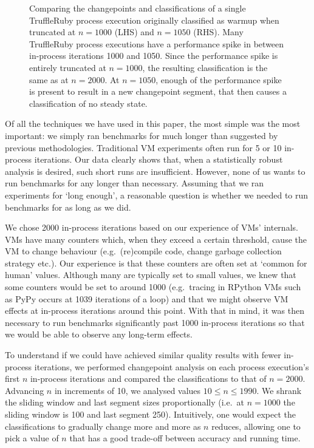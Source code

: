 \documentclass[acmsmall]{acmart}\settopmatter{printfolios=true}
\begin{document}
\begin{figure}[!tbp]
\begin{minipage}[t]{0.485\textwidth}
\end{minipage}
\caption{Comparing the changepoints and classifications of a
single TruffleRuby process execution originally classified as warmup when
truncated at $n = 1000$ (LHS) and $n = 1050$ (RHS). Many TruffleRuby process
executions have a performance spike in between in-process iterations 1000 and
1050. Since the performance spike is entirely truncated at $n=1000$,
the resulting classification is the same as at $n=2000$. At $n=1050$,
enough of the performance spike is present to result in a new changepoint segment,
that then causes a classification of no steady state.}
\label{fig:truncated}
\end{figure}

Of all the techniques we have used in this paper, the most simple was the most
important: we simply ran benchmarks for much longer than suggested by previous methodologies.
Traditional VM experiments often run for 5 or 10 in-process iterations. Our data
clearly shows that, when a statistically robust analysis is desired, such short
runs are insufficient. However, none of us wants to run benchmarks for any longer
than necessary. Assuming that we ran
experiments for `long enough', a reasonable question is whether we needed to run
benchmarks for as long as we did.

We chose 2000 in-process iterations based on our experience of VMs' internals.
VMs have many counters which, when they exceed a certain threshold, cause the VM
to change behaviour (e.g.~(re)compile code, change garbage collection strategy
etc.). Our experience is that these counters are often set at `common for human'
values. Although many are typically set to small values, we knew that some
counters would be set to around 1000 (e.g.~tracing in RPython VMs such
as PyPy occurs at 1039 iterations of a loop) and that we might observe VM effects at in-process iterations
around this point. With that in mind, it was then necessary to
run benchmarks significantly past 1000 in-process iterations so that we would
be able to observe any long-term effects.

To understand if we could have achieved similar quality results with fewer in-process
iterations, we performed changepoint analysis on each process execution's first
$n$ in-process iterations and compared the classifications to that of $n=2000$.
Advancing $n$ in increments of 10, we analysed values $10 \leq n \leq 1990$. We shrank the
sliding window and last segment sizes proportionally (i.e.~at $n=1000$ the
sliding window is 100 and last segment 250). Intuitively, one
would expect the classifications to gradually change more and more as $n$ reduces, allowing
one to pick a value of $n$ that has a good trade-off between accuracy and running time.
\end{document}

